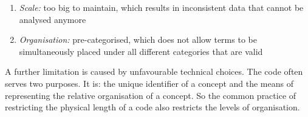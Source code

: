 \begin{enumerate}
    \item \emph{Scale:} too big to maintain, which results in inconsistent data
        that cannot be analysed anymore
    \item \emph{Organisation:} pre-categorised, which does not allow terms to
        be simultaneously placed under all different categories that are valid
\end{enumerate}

A further limitation is caused by unfavourable technical choices. The code often
serves two purposes. It is: the unique identifier of a concept and the means of
representing the relative organisation of a concept. So the common practice of
restricting the physical length of a code also restricts the levels of
organisation.

